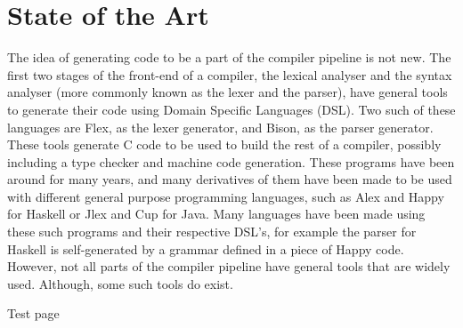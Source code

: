 \chapter{State of the Art}
\label{chap:sota}
The idea of generating code to be a part of the compiler pipeline is not new.
The first two stages of the front-end of a compiler, the lexical analyser and the syntax analyser (more commonly known as the lexer and the parser), have general tools to generate their code using Domain Specific Languages (DSL)\cite{Bentley:1986:PPL:6424.315691,van2000domain}.
Two such of these languages are Flex\cite{Levine:2009:FB:1696439}, as the lexer generator, and Bison\cite{Levine:2009:FB:1696439}, as the parser generator.
These tools generate C code to be used to build the rest of a compiler, possibly including a type checker and machine code generation.
These programs have been around for many years, and many derivatives of them have been made to be used with different general purpose programming languages, such as Alex and Happy for Haskell or Jlex and Cup for Java\cite{ranta2012implementing}.
Many languages have been made using these such programs and their respective DSL's, for example the parser for Haskell is self-generated by a grammar defined in a piece of Happy code.
However, not all parts of the compiler pipeline have general tools that are widely used.
Although, some such tools do exist\cite{grimm2007typical,ruler}.

%


\pagebreak
Test page
